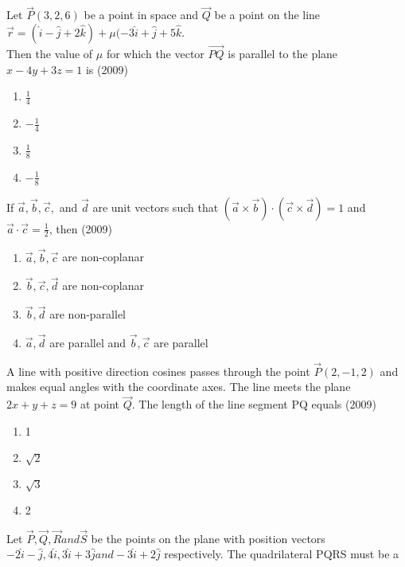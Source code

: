     \item Let $\vec{P}(3,2,6)$ be a point in space and $\vec{Q}$ be a point on the line \\ 
    $\vec{r} = (\hat{i} - \hat{j} + 2\hat{k}) + \mu(-3\hat{i} +\hat{j}+5\hat{k}.$
    \\ Then the value of $\mu$ for which the vector $\overrightarrow{PQ}$ is parallel to the plane $x-4y+3z=1$ is
    \hfill{(2009)}
    \begin{multicols}{2}
    \begin{enumerate}
    \item $\frac{1}{4}$
    \item $-\frac{1}{4}$
    \item $\frac{1}{8}$
    \item $-\frac{1}{8}$
    \end{enumerate}
    \end{multicols}
    \item If $\vec{a}, \vec{b}, \vec{c},$ and $\vec{d}$ are unit vectors such that $(\vec{a} \times \vec{b}) \cdot (\vec{c} \times \vec{d}) = 1$ and $\vec{a} \cdot \vec{c} = \frac{1}{2}$, then
    \hfill{(2009)}
    \begin{enumerate}
    \item $\vec{a}, \vec{b}, \vec{c}$ are non-coplanar
    \item $\vec{b}, \vec{c}, \vec{d}$ are non-coplanar
    \item $\vec{b}, \vec{d}$ are non-parallel
    \item $\vec{a}, \vec{d}$ are parallel and $\vec{b}, \vec{c}$ are parallel 
    \end{enumerate}
    \item A line with positive direction cosines passes through the point $\vec{P}(2,-1,2)$ and makes equal angles with the coordinate axes. The line meets the plane $2x+y+z=9$ at point $\vec{Q}$. The length of the line segment PQ equals 
    \hfill{(2009)}
    \begin{multicols}{2}
    \begin{enumerate}
    \item 1
    \item $\sqrt{2}$
    \item $\sqrt{3}$
    \item 2
    \end{enumerate}
    \end{multicols}
    \item Let $\vec{P}, \vec{Q}, \vec{R} and \vec{S}$ be the points on the plane with position vectors $-2\hat{i} -\hat{j},4\hat{i},3\hat{i}+3\hat{j} and -3\hat{i}+2\hat{j}$ respectively. The quadrilateral PQRS must be a 
